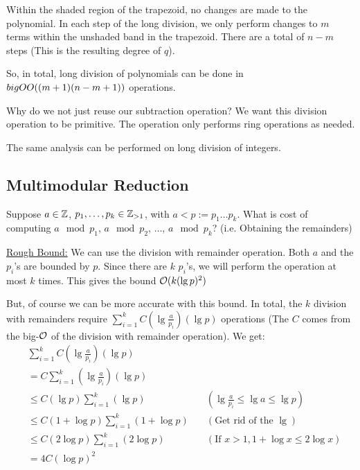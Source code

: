 Within the shaded region of the trapezoid, no changes are made to the polynomial.
In each step of the long division, we only perform changes to $m$ terms within the unshaded band in the trapezoid.
There are a total of $n-m$ steps (This is the resulting degree of $q$).

So, in total, long division of polynomials can be done in $\\bigO{O}((m+1)(n-m+1))$ operations.

\begin{note}
    Why do we not just reuse our subtraction operation? We want this division operation to be primitive. The operation only performs ring operations as needed.
\end{note}

The same analysis can be performed on long division of integers.

\subsection{Multimodular Reduction}
Suppose $a \in \operatorname{\mathbb{Z}}$, $p_1, \ldots, p_k \in \operatorname{\mathbb{Z}}_{> 1}$, with $a < p := p_1\ldots p_k$. What is cost of computing $a \mod p_1$, $a \mod p_2$, $\ldots$, $a \mod p_k$? (i.e. Obtaining the remainders)

\ul{Rough Bound:} We can use the division with remainder operation.
Both $a$ and the $p_i$'s are bounded by $p$.
Since there are $k$ $p_i$'s, we will perform the operation at most $k$ times.
This gives the bound $\operatorname{\mathcal{O}}(k(\lg p)^2)$

But, of course we can be more accurate with this bound.
In total, the $k$ division with remainders require $\sum_{i = 1}^k C\left(\lg \frac{a}{p_i}\right)\left(\lg p\right)$ operations (The $C$ comes from the big-$\operatorname{\mathcal{O}}$ of the division with remainder operation).
We get:
\begin{equation*}
\begin{aligned}
    &\sum_{i = 1}^k C\left(\lg \frac{a}{p_i}\right)\left(\lg p\right)\\
    &= C \sum_{i = 1}^k \left(\lg \frac{a}{p_i}\right)\left(\lg p\right) \\
    &\leq C \left(\lg p\right) \sum_{i = 1}^k \left(\lg p\right) \quad &(\lg \frac{a}{p_i} \leq \lg a \leq \lg p) \\
    &\leq C (1 + \log p) \sum_{i = 1}^k (1 + \log p) \quad & (\text{Get rid of the }\lg)\\
    &\leq C (2\log p) \sum_{i = 1}^k (2\log p) \quad & (\text{If } x > 1, 1 + \log x \leq 2\log x)\\
    &=4C(\log p)^2
\end{aligned}
\end{equation*}